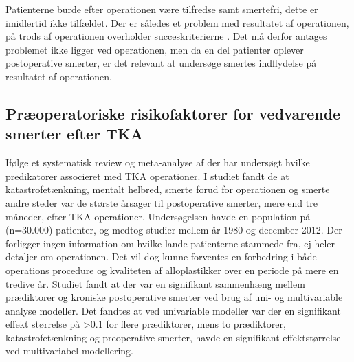 Patienterne burde efter operationen være tilfredse samt smertefri, dette er imidlertid ikke tilfældet. Der er således et problem med resultatet af operationen, på trods af operationen overholder succeskriterierne \citep{aarsrapport2016}. Det må derfor antages problemet ikke ligger ved operationen, men da en del patienter oplever postoperative smerter, er det relevant at undersøge smertes indflydelse på resultatet af operationen. 

\subsection{Præoperatoriske risikofaktorer for vedvarende smerter efter TKA}

Ifølge et systematisk review og meta-analyse af \cite{Lewis2015} der har undersøgt hvilke predikatorer associeret med TKA operationer. I studiet fandt de at katastrofetænkning, mentalt helbred, smerte forud for operationen og smerte andre steder var de største årsager til postoperative smerter, mere end tre måneder, efter TKA operationer. Undersøgelsen havde en population på (n=30.000) patienter, og medtog studier mellem år 1980 og december 2012.\citep{Lewis2015} Der forligger ingen information om hvilke lande patienterne stammede fra, ej heler detaljer om operationen. Det vil dog kunne forventes en forbedring i både operations procedure og kvaliteten af alloplastikker over en periode på mere en tredive år. Studiet fandt at der var en signifikant sammenhæng mellem prædiktorer og kroniske postoperative smerter ved brug af uni- og multivariable analyse modeller.\citep{Lewis2015} Det fandtes at ved univariable modeller var der en signifikant effekt størrelse på >0.1 for flere prædiktorer, mens to prædiktorer, katastrofetænkning og preoperative smerter, havde en signifikant effektstørrelse ved multivariabel modellering.\citep{Lewis2015} 


%
%


	
%

